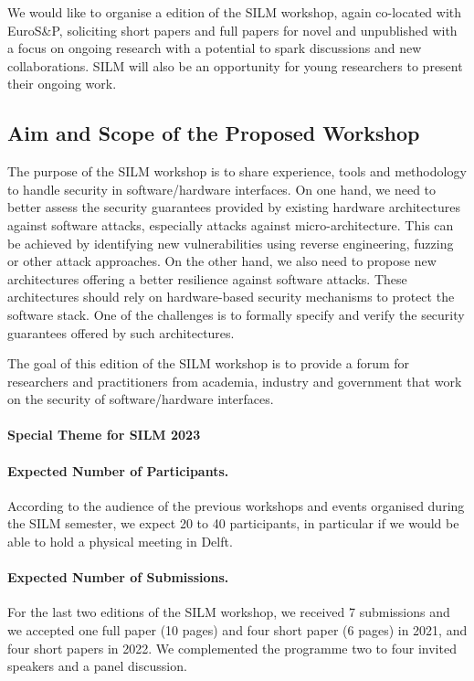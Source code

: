 \documentclass[a4paper,11pt]{article}
\newcommand{\SILMNum}{\nth{5}}
\newcommand{\SILMYear}{2023}
\begin{document}
We would like to organise a \SILMNum{} edition of the SILM workshop, again
co-located with EuroS\&P, soliciting short papers and full papers for novel
and unpublished with a focus on ongoing research with a potential to spark
discussions and new collaborations. SILM will also be an opportunity for
young researchers to present their ongoing work.

\subsection{Aim and Scope of the Proposed Workshop}
%
The purpose of the SILM workshop is to share experience, tools and
methodology to handle security in software/hardware interfaces. On one
hand, we need to better assess the security guarantees provided by existing
hardware architectures against software attacks, especially attacks against
micro-architecture. This can be achieved by identifying new vulnerabilities
using reverse engineering, fuzzing or other attack approaches. On the other
hand, we also need to propose new architectures offering a better
resilience against software attacks. These architectures should rely on
hardware-based security mechanisms to protect the software stack. One of
the challenges is to formally specify and verify the security guarantees
offered by such architectures.

The goal of this \SILMNum{} edition of the SILM workshop is to provide a forum
for  researchers and practitioners from academia, industry and government
that work on the security of software/hardware interfaces.

\paragraph{Special Theme for SILM \SILMYear{}}

\paragraph{Expected Number of Participants.}
%
According to the audience of the previous workshops and events organised
during the SILM semester, we expect 20 to 40 participants, in particular if
we would be able to hold a physical meeting in Delft.

\paragraph{Expected Number of Submissions.}
%
For the last two editions of the SILM workshop, we received 7 submissions
and we accepted one full paper (10 pages) and four short paper (6 pages) in
2021, and four short papers in 2022. We complemented the programme two to
four invited speakers and a panel discussion.
\end{document}
